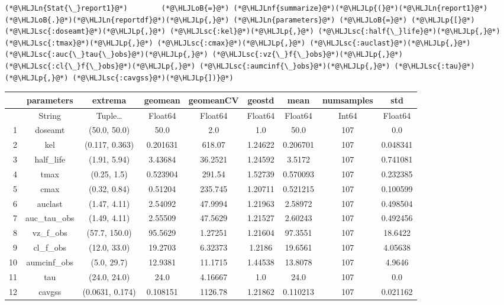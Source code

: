 \documentclass[12pt,a4paper]{article}
\newcommand{\HLJLn}[1]{#1}
\newcommand{\HLJLnf}[1]{\textcolor[RGB]{66,102,213}{#1}}
\newcommand{\HLJLsc}[1]{\textcolor[RGB]{201,61,57}{#1}}
\newcommand{\HLJLoB}[1]{\textcolor[RGB]{102,102,102}{\textbf{#1}}}
\newcommand{\HLJLp}[1]{#1}
\begin{document}
\begin{lstlisting}
(*@\HLJLn{Stat{\_}report1}@*)        (*@\HLJLoB{=}@*) (*@\HLJLnf{summarize}@*)(*@\HLJLp{(}@*)(*@\HLJLn{report1}@*)(*@\HLJLoB{.}@*)(*@\HLJLn{reportdf}@*)(*@\HLJLp{,}@*) (*@\HLJLn{parameters}@*) (*@\HLJLoB{=}@*) (*@\HLJLp{[}@*)(*@\HLJLsc{:doseamt}@*)(*@\HLJLp{,}@*) (*@\HLJLsc{:kel}@*)(*@\HLJLp{,}@*) (*@\HLJLsc{:half{\_}life}@*)(*@\HLJLp{,}@*) (*@\HLJLsc{:tmax}@*)(*@\HLJLp{,}@*) (*@\HLJLsc{:cmax}@*)(*@\HLJLp{,}@*) (*@\HLJLsc{:auclast}@*)(*@\HLJLp{,}@*) (*@\HLJLsc{:auc{\_}tau{\_}obs}@*)(*@\HLJLp{,}@*) (*@\HLJLsc{:vz{\_}f{\_}obs}@*)(*@\HLJLp{,}@*) (*@\HLJLsc{:cl{\_}f{\_}obs}@*)(*@\HLJLp{,}@*) (*@\HLJLsc{:aumcinf{\_}obs}@*)(*@\HLJLp{,}@*) (*@\HLJLsc{:tau}@*)(*@\HLJLp{,}@*) (*@\HLJLsc{:cavgss}@*)(*@\HLJLp{])}@*)
\end{lstlisting}


\begin{tabular}{r|cccccccc}
	& parameters & extrema & geomean & geomeanCV & geostd & mean & numsamples & std\\
	\hline
	& String & Tuple… & Float64 & Float64 & Float64 & Float64 & Int64 & Float64\\
	\hline
	1 & doseamt & (50.0, 50.0) & 50.0 & 2.0 & 1.0 & 50.0 & 107 & 0.0 \\
	2 & kel & (0.117, 0.363) & 0.201631 & 618.07 & 1.24622 & 0.206701 & 107 & 0.048341 \\
	3 & half\_life & (1.91, 5.94) & 3.43684 & 36.2521 & 1.24592 & 3.5172 & 107 & 0.741081 \\
	4 & tmax & (0.25, 1.5) & 0.523904 & 291.54 & 1.52739 & 0.570093 & 107 & 0.232385 \\
	5 & cmax & (0.32, 0.84) & 0.51204 & 235.745 & 1.20711 & 0.521215 & 107 & 0.100599 \\
	6 & auclast & (1.47, 4.11) & 2.54092 & 47.9994 & 1.21963 & 2.58972 & 107 & 0.498504 \\
	7 & auc\_tau\_obs & (1.49, 4.11) & 2.55509 & 47.5629 & 1.21527 & 2.60243 & 107 & 0.492456 \\
	8 & vz\_f\_obs & (57.7, 150.0) & 95.5629 & 1.27251 & 1.21604 & 97.3551 & 107 & 18.6422 \\
	9 & cl\_f\_obs & (12.0, 33.0) & 19.2703 & 6.32373 & 1.2186 & 19.6561 & 107 & 4.05638 \\
	10 & aumcinf\_obs & (5.0, 29.7) & 12.9381 & 11.1715 & 1.44538 & 13.8078 & 107 & 4.9646 \\
	11 & tau & (24.0, 24.0) & 24.0 & 4.16667 & 1.0 & 24.0 & 107 & 0.0 \\
	12 & cavgss & (0.0631, 0.174) & 0.108151 & 1126.78 & 1.21862 & 0.110213 & 107 & 0.021162 \\
\end{tabular}
\end{document}
